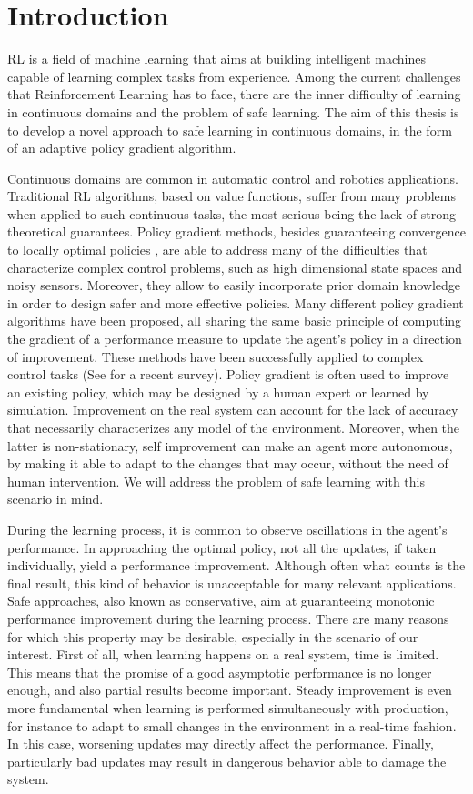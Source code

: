 \chapter{Introduction}
\ac{RL} is a field of machine learning that aims at building intelligent machines capable of learning complex tasks from experience. Among the current challenges that Reinforcement Learning has to face, there are the inner difficulty of learning in continuous domains and the problem of safe learning. The aim of this thesis is to develop a novel approach to safe learning in continuous domains, in the form of an adaptive policy gradient algorithm.

Continuous domains are common in automatic control and robotics applications. Traditional \ac{RL} algorithms, based on value functions, suffer from many problems when applied to such continuous tasks, the most serious being the lack of strong theoretical guarantees.
Policy gradient methods, besides guaranteeing convergence to locally optimal policies \cite{Sutton1999a}, are able to address many of the difficulties that characterize complex control problems, such as high dimensional state spaces and noisy sensors. Moreover, they allow to easily incorporate prior domain knowledge in order to design safer and more effective policies.
Many different policy gradient algorithms have been proposed, all sharing the same basic principle of computing the gradient of a performance measure to update the agent's policy in a direction of improvement. These methods have been successfully applied to complex control tasks (See \cite{deisenroth2013survey} for a recent survey). 
Policy gradient is often used to improve an existing policy, which may be designed by a human expert or learned by simulation. Improvement on the real system can account for the lack of accuracy that necessarily characterizes any model of the environment. Moreover, when the latter is non-stationary, self improvement can make an agent more autonomous, by making it able to adapt to the changes that may occur, without the need of human intervention. We will address the problem of safe learning with this scenario in mind.

During the learning process, it is common to observe oscillations in the agent's performance. In approaching the optimal policy, not all the updates, if taken individually, yield a performance improvement. Although often what counts is the final result, this kind of behavior is unacceptable for many relevant applications. Safe approaches, also known as conservative, aim at guaranteeing monotonic performance improvement during the learning process. There are many reasons for which this property may be desirable, especially in the scenario of our interest. First of all, when learning happens on a real system, time is limited. This means that the promise of a good asymptotic performance is no longer enough, and also partial results become important. Steady improvement is even more fundamental when learning is performed simultaneously with production, for instance to adapt to small changes in the environment in a real-time fashion. In this case, worsening updates may directly affect the performance.
Finally, particularly bad updates may result in dangerous behavior able to damage the system. 

